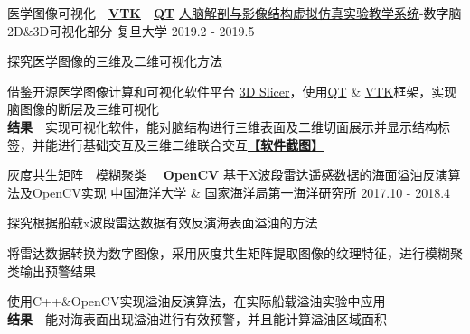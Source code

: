 \begin{cventries}
  \cventry
    {医学图像可视化~~\href{https://vtk.org/}{\textbf{VTK}}~~\href{https://www.qt.io/cn}{\textbf{QT}}} %
    {\href{http://ilab.fudan.edu.cn/med7}{人脑解剖与影像结构虚拟仿真实验教学系统}-数字脑2D\&3D可视化部分} %
    {复旦大学} %
    {2019.2 - 2019.5} %
    {
      \begin{cvitems} %
        \item {探究医学图像的三维及二维可视化方法}
        \item {借鉴开源医学图像计算和可视化软件平台 \href{https://www.slicer.org/}{3D Slicer}，使用\href{https://www.qt.io/cn}{QT} \& \href{https://vtk.org/}{VTK}框架，实现脑图像的断层及三维可视化}\\
        \textbf{结果}~~实现可视化软件，能对脑结构进行三维表面及二维切面展示并显示结构标签，并能进行基础交互及三维二维联合交互\href{https://github.com/Littlehhh/Medical-Image-Visualization}{\textbf{【软件截图】}}
      \end{cvitems}
    }

  \cventry
    {灰度共生矩阵~~模糊聚类~~ \href{https://opencv.org/}{\textbf{OpenCV}}} %
    {基于X波段雷达遥感数据的海面溢油反演算法及OpenCV实现} %
    {中国海洋大学 \& 国家海洋局第一海洋研究所} %
    {2017.10 - 2018.4} %
    {
      \begin{cvitems} %
        \item {探究根据船载x波段雷达数据有效反演海表面溢油的方法}
        \item {将雷达数据转换为数字图像，采用灰度共生矩阵提取图像的纹理特征，进行模糊聚类输出预警结果}
        \item {使用C++\&OpenCV实现溢油反演算法，在实际船载溢油实验中应用}\\
        \textbf{结果}~~能对海表面出现溢油进行有效预警，并且能计算溢油区域面积
      \end{cvitems}
    }

\end{cventries}
